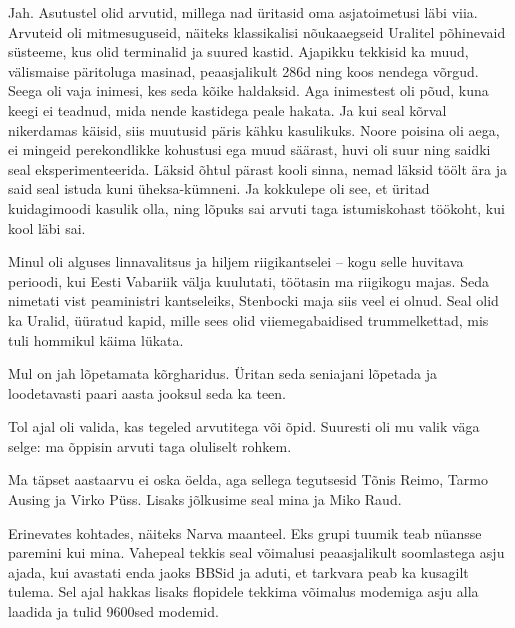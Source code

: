 
Jah. Asutustel olid arvutid, millega nad üritasid oma asjatoimetusi läbi viia.
Arvuteid oli mitmesuguseid, näiteks klassikalisi nõukaaegseid Uralitel 
põhinevaid süsteeme, kus olid terminalid ja suured kastid.
Ajapikku tekkisid ka muud, välismaise päritoluga masinad, peaasjalikult 
286d ning koos nendega võrgud. Seega oli vaja 
inimesi, kes seda kõike haldaksid. Aga inimestest oli põud, kuna 
keegi ei teadnud, mida nende kastidega peale hakata. Ja kui seal kõrval 
nikerdamas käisid, siis muutusid päris kähku kasulikuks. Noore poisina oli 
aega, ei mingeid perekondlikke kohustusi ega muud säärast, huvi oli suur ning 
saidki seal eksperimenteerida. Läksid õhtul pärast kooli sinna, nemad läksid 
töölt ära ja said seal istuda kuni üheksa-kümneni. Ja kokkulepe oli see, et üritad kuidagimoodi kasulik olla, ning 
lõpuks sai arvuti taga istumiskohast töökoht, kui kool läbi sai.


Minul oli alguses linnavalitsus ja hiljem 
riigikantselei -- kogu selle 
huvitava perioodi, kui Eesti Vabariik välja kuulutati, töötasin ma
riigikogu majas. Seda nimetati 
vist peaministri kantseleiks, Stenbocki maja siis veel ei olnud. Seal olid ka 
Uralid, 
üüratud kapid, mille sees olid viiemegabaidised trummelkettad, mis tuli 
hommikul käima lükata.


Mul on jah lõpetamata kõrgharidus. 
Üritan seda seniajani lõpetada ja loodetavasti paari aasta 
jooksul seda ka teen.

Tol ajal oli valida, kas tegeled arvutitega või õpid. Suuresti oli mu valik 
väga selge: ma õppisin arvuti taga oluliselt rohkem.


Ma täpset aastaarvu ei oska öelda, aga sellega tegutsesid 
Tõnis Reimo, Tarmo 
Ausing ja Virko Püss. Lisaks
jõlkusime seal mina ja Miko Raud.


Erinevates kohtades, näiteks Narva maanteel. Eks grupi tuumik 
teab nüansse paremini kui mina. Vahepeal tekkis seal 
võimalusi peaasjalikult soomlastega asju ajada, kui avastati enda jaoks BBSid ja aduti, et tarkvara peab ka kusagilt tulema. Sel ajal
hakkas lisaks flopidele tekkima võimalus modemiga asju alla laadida ja tulid 9600sed modemid.


